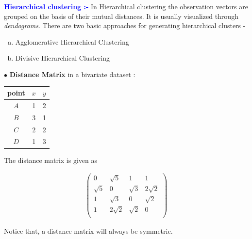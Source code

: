 \documentclass[11pt, a4paper]{article}
\begin{document}
\leftpointright \hspace{0.2cm} \textbf{\textcolor{blue}{Hierarchical clustering :-}} In Hierarchical clustering the observation vectors are grouped on the basis of their mutual distances. It is usually visualized through \textit{dendograms}. There are two basic approaches for generating hierarchical clusters - 

\begin{enumerate} [(a)]
\item Agglomerative Hierarchical Clustering
\item Divisive Hierarchical Clustering
\end{enumerate}

$\bullet$ \textbf{Distance Matrix} in a bivariate dataset :

\begin{table}[!htbp]
\def\arraystretch{1.5}

\begin{center}
\begin{tabular}{|c|c|c|}

\hline

point & $x$ & $y$ \\

\hline

$A$ & 1 & 2 \\

$B$ & 3 & 1 \\

$C$ & 2 & 2 \\

$D$ & 1 & 3 \\

\hline

\end{tabular}
\end{center}

\end{table}

The distance matrix is given as 

\begin{gather*}
\begin{pmatrix}
0 & \sqrt{5} & 1 & 1 \\
\sqrt{5} & 0 & \sqrt{3} & 2\sqrt{2} \\
1 & \sqrt{3} & 0 & \sqrt{2} \\
1 & 2\sqrt{2} & \sqrt{2} & 0 \\
\end{pmatrix}
\end{gather*}

Notice that, a distance matrix will always be symmetric.
\end{document}
